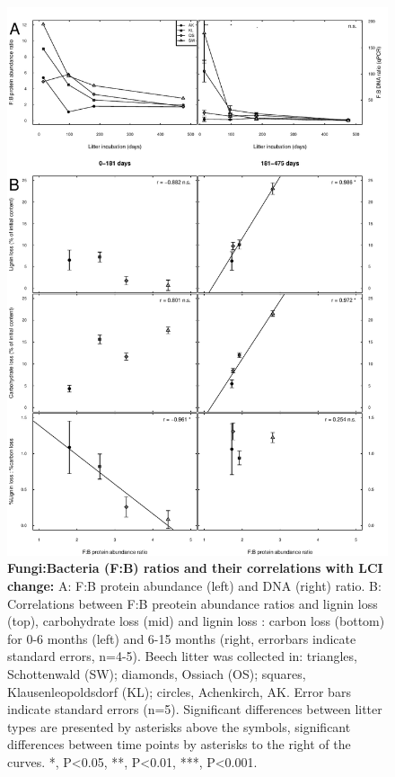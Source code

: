 \documentclass[10pt]{article}
\begin{document}
\begin{flushleft}
\begin{figure}[!ht]
\begin{center}
\includegraphics{ligpaper-f2bnew}
\end{center}
\caption{
{\bf Fungi:Bacteria (F:B) ratios and their correlations with LCI change:} A: F:B protein abundance (left) and DNA (right) ratio. B: Correlations between F:B preotein abundance ratios and lignin loss (top), carbohydrate loss (mid) and lignin loss : carbon loss (bottom) for 0-6 months (left) and 6-15 months (right, errorbars indicate standard errors, n=4-5).  Beech litter was collected in: triangles, Schottenwald (SW); diamonds, Ossiach (OS); squares, Klausenleopoldsdorf (KL); circles, Achenkirch, AK. Error bars indicate standard errors (n=5). Significant differences between litter types are presented by asterisks above the symbols, significant differences between time points by asterisks to the right of the curves. *, P\textless 0.05, **, P\textless 0.01, ***, P\textless 0.001.}
\label{fig:f2b}
\end{figure}


\end{flushleft}
\end{document}
